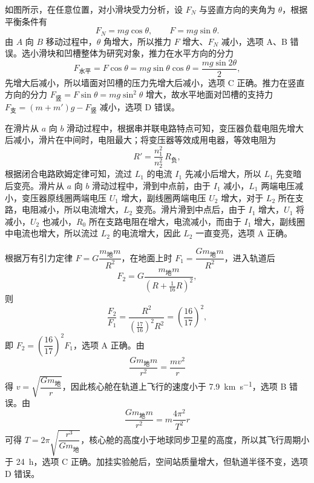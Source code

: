 \begin{answer}
如图所示，在任意位置，对小滑块受力分析，设 $F_{N}$ 与竖直方向的夹角为 $\theta$，根据平衡条件有
\[
  F_{N}=mg\cos\theta,\qquad F=mg\sin\theta.
\]
由 $A$ 向 $B$ 移动过程中，$\theta$ 角增大，所以推力 $F$ 增大、$F_{N}$ 减小，选项 A、B 错误。选小滑块和凹槽整体为研究对象，推力在水平方向的分力
\[
  F_{\text{水平}}=F\cos\theta=mg\sin\theta\cos\theta=\frac{mg\sin2\theta}{2},
\]
先增大后减小，所以墙面对凹槽的压力先增大后减小，选项 C 正确。推力在竖直方向的分力 $F_{\text{竖}}=F\sin\theta=mg\sin^{2}\theta$ 增大，故水平地面对凹槽的支持力 $F_{\text{支}}=(m+m')g-F_{\text{竖}}$ 减小，选项 D 错误。

\end{answer}

\begin{answer}
在滑片从 $a$ 向 $b$ 滑动过程中，根据串并联电路特点可知，变压器负载电阻先增大后减小，滑片在中间时，电阻最大；将变压器等效成用电器，等效电阻为
\[
  R'=\frac{n_{1}^{2}}{n_{2}^{2}}\,R_{\text{负}},
\]
根据闭合电路欧姆定律可知，流过 $L_{1}$ 的电流 $I_{1}$ 先减小后增大，所以 $L_{1}$ 先变暗后变亮。滑片从 $a$ 向 $b$ 滑动过程中，滑到中点前，由于 $I_{1}$ 减小，$L_{1}$ 两端电压减小，变压器原线圈两端电压 $U_{1}$ 增大，副线圈两端电压 $U_{2}$ 增大，对于 $L_{2}$ 所在支路，电阻减小，所以电流增大，$L_{2}$ 变亮。滑片滑到中点后，由于 $I_{1}$ 增大，$U_{1}$ 将减小，$U_{2}$ 也减小，$R_{0}$ 所在支路电阻在增大，电流减小，而由于 $I_{1}$ 增大，副线圈中电流也增大，所以流过 $L_{2}$ 的电流增大，因此 $L_{2}$ 一直变亮，选项 A 正确。
\end{answer}

\begin{answer}
根据万有引力定律 $F=G\dfrac{m_{\text{地}}m}{R^{2}}$，在地面上时 $F_{1}=\dfrac{Gm_{\text{地}}m}{R^{2}}$，进入轨道后
\[
  F_{2}=G\frac{m_{\text{地}}m}{\left(R+\frac{1}{16}R\right)^{2}},
\]
则
\[
  \frac{F_{2}}{F_{1}}=\frac{R^{2}}{\left(\frac{17}{16}\right)^{2}R^{2}}=\left(\frac{16}{17}\right)^{2},
\]
即 $F_{2}=\left(\dfrac{16}{17}\right)^{2}F_{1}$，选项 A 正确。由
\[
  \frac{Gm_{\text{地}}m}{r^{2}}=\frac{mv^{2}}{r}
\]
得 $v=\sqrt{\dfrac{Gm_{\text{地}}}{r}}$，因此核心舱在轨道上飞行的速度小于 \SI{7.9}{\kilo\metre\per\second}，选项 B 错误。由
\[
  \frac{Gm_{\text{地}}m}{r^{2}}=m\frac{4\pi^{2}}{T^{2}}r
\]
可得 $T=2\pi\sqrt{\dfrac{r^{3}}{Gm_{\text{地}}}}$，核心舱的高度小于地球同步卫星的高度，所以其飞行周期小于 \SI{24}{\hour}，选项 C 正确。加挂实验舱后，空间站质量增大，但轨道半径不变，选项 D 错误。
\end{answer}

